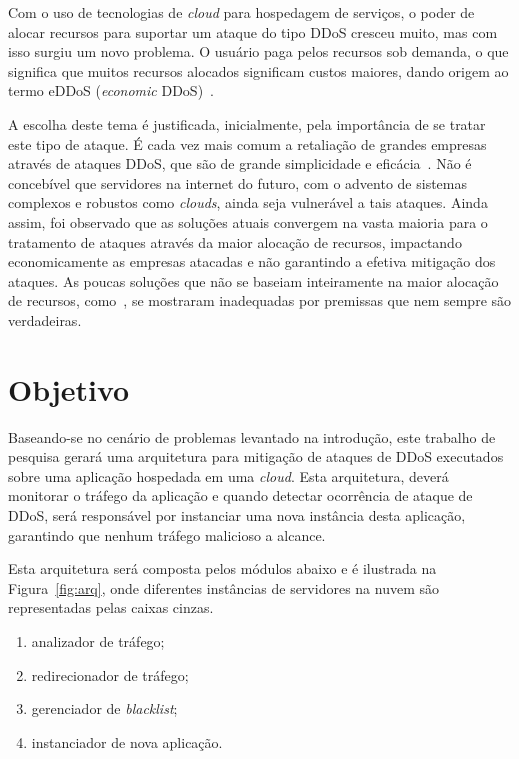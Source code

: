 \documentclass[a4paper, 11pt]{article}
\begin{document}
Com o uso de tecnologias de \emph{cloud} para hospedagem de serviços, o poder de alocar recursos para suportar um ataque do tipo DDoS cresceu muito, mas com isso surgiu um novo problema. O usuário paga pelos recursos sob demanda, o que significa que muitos recursos alocados significam custos maiores, dando origem ao termo eDDoS (\emph{economic} DDoS)~\cite{Soon:10}.

A escolha deste tema é justificada, inicialmente, pela importância de se tratar este tipo de ataque. É cada vez mais comum a retaliação de grandes empresas através de ataques DDoS, que são de grande simplicidade e eficácia~\cite{ddosatks}. Não é concebível que servidores na internet do futuro, com o advento de sistemas complexos e robustos como \emph{clouds}, ainda seja vulnerável a tais ataques. Ainda assim, foi observado que as soluções atuais convergem na vasta maioria para o tratamento de ataques através da maior alocação de recursos, impactando economicamente as empresas atacadas e não garantindo a efetiva mitigação dos ataques. As poucas soluções que não se baseiam inteiramente na maior alocação de recursos, como~\cite{Soon:10}, se mostraram inadequadas por premissas que nem sempre são verdadeiras.

\section{Objetivo}
Baseando-se no cen\'ario de problemas levantado na introdu\c{c}\~{a}o, este
trabalho de pesquisa gerar\'a uma arquitetura para mitigação de ataques de
DDoS executados sobre uma aplicação hospedada em uma \emph{cloud}. Esta
arquitetura, dever\'a monitorar o tr\'afego da aplica\c{c}\~{a}o e quando
detectar
ocorrência de ataque de DDoS, ser\'a respons\'avel por instanciar uma nova
instância desta
aplica\c{c}\~{a}o, garantindo que nenhum tr\'afego malicioso a alcance.

Esta arquitetura será composta pelos módulos abaixo e é ilustrada na
Figura~\ref{fig:arq}, onde diferentes inst\^ancias de servidores na nuvem s\~ao
representadas pelas caixas cinzas.

\begin{enumerate}[i]
  \item analizador de tráfego;
  \item redirecionador de tráfego;
  \item gerenciador de \emph{blacklist};
  \item instanciador de nova aplica\c{c}\~{a}o.
\end{enumerate}
\end{document}
